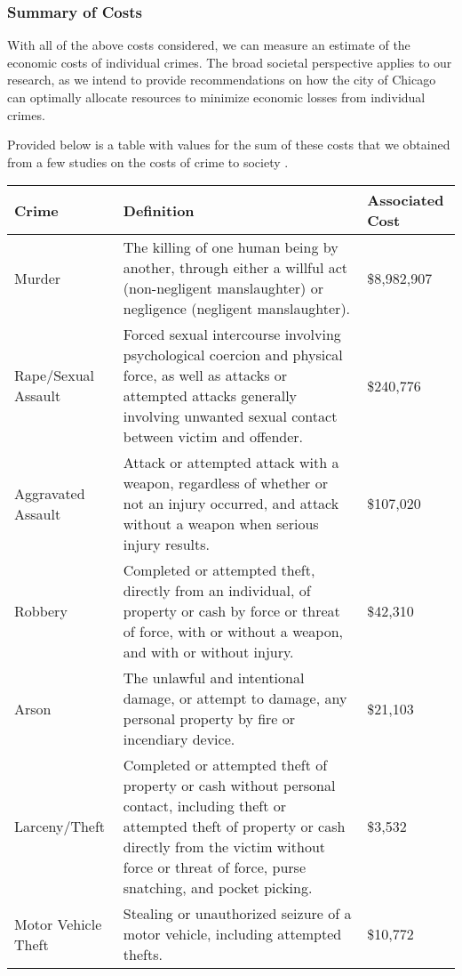\documentclass{article}
\begin{document}
\begin{onehalfspacing}
\subsubsection{Summary of Costs}
With all of the above costs considered, we can measure an estimate of the economic costs of individual crimes. The broad societal perspective applies to our research, as we intend to provide recommendations on how the city of Chicago can optimally allocate resources to minimize economic losses from individual crimes. 

Provided below is a table with values for the sum of these costs that we obtained from a few studies on the costs of crime to society \cite{costs}\cite{costs-nar}\cite{DEA}.
\begin{center}
\begin{tabular}{ | m{1in} | m{4in}| m{1in} | } 
  \hline
  Crime & Definition & Associated Cost \\
  \hline \hline
  Murder & The killing of one human being by another, through either a willful act (non-negligent manslaughter) or negligence (negligent manslaughter). & \$8,982,907 \\ 
  \hline
  Rape/Sexual Assault & Forced sexual intercourse involving psychological coercion and physical force, as well as attacks or attempted attacks generally involving unwanted sexual contact between victim and offender. & \$240,776 \\ 
  \hline
  Aggravated Assault & Attack or attempted attack with a weapon, regardless of whether or not an injury occurred, and attack without a weapon when serious injury results. & \$107,020 \\
  \hline
  Robbery & Completed or attempted theft, directly from an individual, of property or cash by force or threat of force, with or without a weapon, and with or without injury. & \$42,310 \\
  \hline
  Arson & The unlawful and intentional damage, or attempt to damage, any personal property by fire or incendiary device. & \$21,103 \\
  \hline
  Larceny/Theft & Completed or attempted theft of property or cash without personal contact, including theft or attempted theft of property or cash directly from the victim without force or threat of force, purse snatching, and pocket picking. & \$3,532 \\
  \hline
  Motor Vehicle Theft & Stealing or unauthorized seizure of a motor vehicle, including attempted thefts. & \$10,772 \\
  \hline

\end{tabular}
\end{center}
\end{onehalfspacing}
\end{document}

